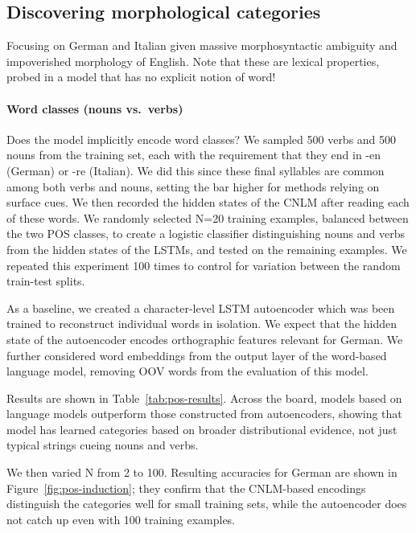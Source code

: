 

\subsection{Discovering morphological categories}
\label{sec:categories}

Focusing on German and Italian given massive morphosyntactic ambiguity
and impoverished morphology of English. Note that these are lexical
properties, probed in a model that has no explicit notion of word!

\paragraph{Word classes (nouns vs.~verbs)}

Does the model implicitly encode word classes?
We sampled 500 verbs and 500 nouns from the training set, each with the requirement that they end in -en (German) or -re (Italian).
We did this since these final syllables are common among both verbs and nouns, setting the bar higher for methods relying on surface cues.
We then recorded the hidden states of the CNLM after reading each of these words.
We randomly selected N=20 training examples, balanced between the two POS classes, to create a logistic classifier distinguishing nouns and verbs from the hidden states of the LSTMs, and tested on the remaining examples.
We repeated this experiment 100 times to control for variation between the random train-test splits.

As a baseline, we created a character-level LSTM autoencoder which was been trained to reconstruct individual words in isolation.
We expect that the hidden state of the autoencoder encodes orthographic features relevant for German.
We further considered word embeddings from the output layer of the word-based language model, removing OOV words from the evaluation of this model.

Results are shown in Table~\ref{tab:pos-results}.
Across the board, models based on language models outperform those constructed from autoencoders, showing  that model has learned categories based on broader distributional evidence, not just typical strings cueing nouns and verbs.


We then varied N from 2 to 100.
Resulting accuracies for German are shown in Figure~\ref{fig:pos-induction}; they confirm that the CNLM-based encodings distinguish the categories well for small training sets, while the autoencoder does not catch up even with 100 training examples.

